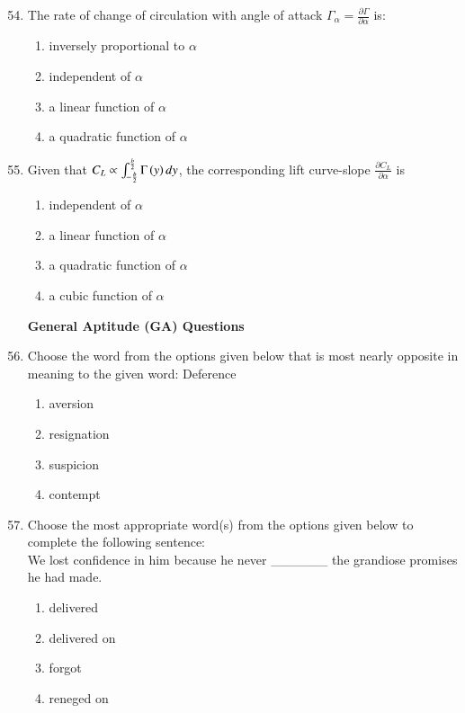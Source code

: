 \documentclass[journal,9pt,onecolumn]{IEEEtran}
\begin{document}
\begin{enumerate}
\setcounter{enumi}{53}
\item The rate of change of circulation with angle of attack $\Gamma_\alpha=\frac{\partial \Gamma}{\partial \alpha}$ is:
   \begin{multicols}{2}
   \begin{enumerate}
       \item inversely proportional to $\alpha$
       \item independent of $\alpha$
       \item a linear function of $\alpha$
       \item a quadratic function of $\alpha$
   \end{enumerate}
   \end{multicols}

\item Given that $C_L \propto \int_{-\frac{b}{2}}^{\frac{b}{2}} \Gamma\left(y\right) d y$, the corresponding lift curve-slope $\frac{\partial C_L}{\partial \alpha}$ is
   \begin{multicols}{2}
   \begin{enumerate}
       \item independent of $\alpha$
       \item a linear function of $\alpha$
       \item a quadratic function of $\alpha$
       \item a cubic function of $\alpha$
   \end{enumerate}
   \end{multicols}
\textbf{General Aptitude (GA) Questions}\\
\item Choose the word from the options given below that is most nearly opposite in meaning to the given word: Deference
   \begin{multicols}{4}
   \begin{enumerate}
       \item aversion
       \item resignation
       \item suspicion
       \item contempt
   \end{enumerate}
   \end{multicols}

\item Choose the most appropriate word(s) from the options given below to complete the following sentence: \\We lost confidence in him because he never \_\_\_\_\_\_ the grandiose promises he had made.
   \begin{multicols}{4}
   \begin{enumerate}
       \item delivered
       \item delivered on
       \item forgot
       \item reneged on
   \end{enumerate}
   \end{multicols}



\end{enumerate}
\end{document}

